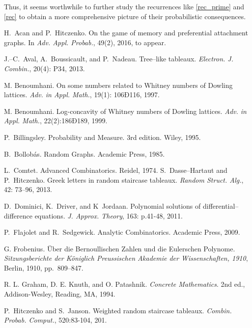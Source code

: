 \documentclass[10pt]{amsart}
\numberwithin{subcase}{case}
\begin{document}
Thus,  it seems worthwhile to further study the recurrences like  \eqref{rec_prime} and \eqref{rec} to obtain a more comprehensive picture of their probabilistic consequences.

\begin{thebibliography}{14}

H.~Acan and P.~Hitczenko.
\newblock On the game of memory and  preferential attachment graphs.
\newblock In \textit{Adv. Appl. Probab.}, 49(2), 2016, to appear.

J.--C.~Aval, A.~Boussicault, and P.~Nadeau.
\newblock Tree--like tableaux. 
\newblock \textit{Electron. J. Combin.}, 20(4): P34, 2013.

 M. Benoumhani. 
\newblock On some numbers related to Whitney numbers of Dowling lattices. 
\newblock\textit{Adv. in
Appl. Math.}, 19(1): 106Ð116, 1997.

 M. Benoumhani. 
\newblock Log-concavity of Whitney numbers of Dowling lattices. 
\newblock\textit{Adv. in Appl. Math.}, 22(2):186Ð189, 1999.

P.~Billingsley.
\newblock Probability and Measure. 3rd edition.
\newblock Wiley, 1995.

B.~Bollob\'as.
\newblock Random Graphs.
\newblock Academic Press, 1985.

L.~Comtet.
\newblock Advanced Combinatorics.
\newblock Reidel, 1974.
S.~Dasse--Hartaut and P.~Hitczenko.
\newblock Greek letters in random staircase tableaux.
\newblock \textit{Random Struct. Alg.}, 42: 73--96,  2013.

D.~Dominici, K.~Driver, and K~Jordaan.
\newblock Polynomial solutions of differential--difference equations.
\newblock \textit{J. Approx. Theory}, 163: p.41-48, 2011.

P.~Flajolet and R.~Sedgewick.
\newblock Analytic Combinatorics.
\newblock Academic Press, 2009.

G. Frobenius. 
\"Uber die Bernoullischen Zahlen
und die Eulerschen Polynome.
\emph{Sitzungsberichte der K\"oniglich Preussischen Akademie der Wissenschaften,
1910}, 
Berlin, 1910,
pp.~809--847.

R. L. Graham, D. E. Knuth, and O. Patashnik.
\emph{Concrete Mathematics}.
2nd ed., Addison-Wesley,  Reading, MA, 1994.

P.~Hitczenko and S.~Janson.
\newblock Weighted random  staircase tableaux.
\newblock \textit{Combin. Probab. Comput.}, 520:83-104, 201.


\end{thebibliography}
\end{document}
